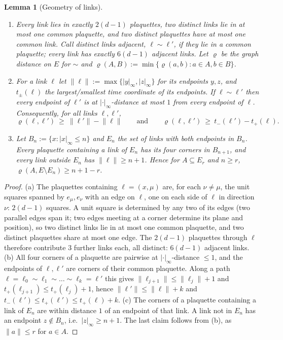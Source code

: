\documentclass[11pt,a4paper]{article}
\newtheorem{lemma}[theorem]{Lemma}
\theoremstyle{definition}
\theoremstyle{remark}
\newcommand{\norm}[1]{\lVert #1\rVert}
\begin{document}
\begin{lemma}[Geometry of links]\label{iv:lem:geometry}
\begin{enumerate}[label=(\alph*)]
\item Every link lies in exactly $2(d-1)$ plaquettes, two distinct links lie in at most one common plaquette, and two
distinct plaquettes have at most one common link. Call distinct links \emph{adjacent}, $\ell\sim\ell'$, if they lie in a
common plaquette; every link has exactly $6(d-1)$ adjacent links. Let $\varrho$ be the graph distance on $E$ for $\sim$ and
$\varrho(A,B):=\min\{\varrho(a,b):a\in A,b\in B\}$.
\item For a link $\ell$ let $\norm\ell:=\max\{|y|_\infty,|z|_\infty\}$ for its endpoints $y,z$, and $t_\pm(\ell)$ the
largest/smallest time coordinate of its endpoints. If $\ell\sim\ell'$ then every endpoint of $\ell'$ is at
$|\cdot|_\infty$-distance at most $1$ from every endpoint of $\ell$. Consequently, for all links $\ell,\ell'$,
\[
\varrho(\ell,\ell')\ \ge\ \norm{\ell'}-\norm\ell\qquad\text{and}\qquad\varrho(\ell,\ell')\ \ge\ t_-(\ell')-t_+(\ell).
\]
\item Let $B_n:=\{x:|x|_\infty\le n\}$ and $E_n$ the set of links with both endpoints in $B_n$. Every plaquette containing
a link of $E_n$ has its four corners in $B_{n+1}$, and every link outside $E_n$ has $\norm\ell\ge n+1$. Hence for
$A\subseteq E_r$ and $n\ge r$, $\varrho(A,E\setminus E_n)\ge n+1-r$.
\end{enumerate}
\end{lemma}

\begin{proof}
(a) The plaquettes containing $\ell=(x,\mu)$ are, for each $\nu\neq\mu$, the unit squares spanned by $e_\mu,e_\nu$ with an
edge on $\ell$, one on each side of $\ell$ in direction $\nu$: $2(d-1)$ squares. A unit square is determined by any two of
its edges (two parallel edges span it; two edges meeting at a corner determine its plane and position), so two distinct
links lie in at most one common plaquette, and two distinct plaquettes share at most one edge. The $2(d-1)$ plaquettes
through $\ell$ therefore contribute $3$ further links each, all distinct: $6(d-1)$ adjacent links.
(b) All four corners of a plaquette are pairwise at $|\cdot|_\infty$-distance $\le1$, and the endpoints of $\ell,\ell'$
are corners of their common plaquette. Along a path $\ell=\ell_0\sim\ell_1\sim\dots\sim\ell_k=\ell'$ this gives
$\norm{\ell_{j+1}}\le\norm{\ell_j}+1$ and $t_+(\ell_{j+1})\le t_+(\ell_j)+1$, hence $\norm{\ell'}\le\norm\ell+k$ and
$t_-(\ell')\le t_+(\ell')\le t_+(\ell)+k$.
(c) The corners of a plaquette containing a link of $E_n$ are within distance $1$ of an endpoint of that link. A link not
in $E_n$ has an endpoint $z\notin B_n$, i.e.\ $|z|_\infty\ge n+1$. The last claim follows from (b), as $\norm a\le r$ for
$a\in A$.
\end{proof}
\end{document}
